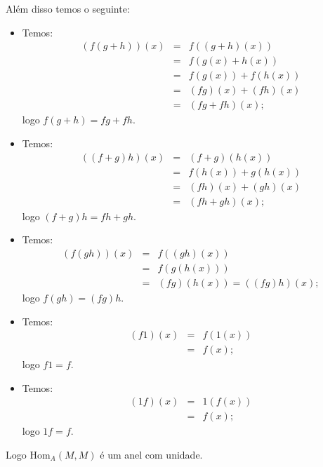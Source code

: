 \documentclass[10pt,a4paper]{article}
\begin{document}
\noindent
Além disso temos o seguinte:
\begin{itemize}
\item Temos:
\[
\begin{array}{rcl}
(f(g+h))(x)&=&f((g+h)(x))\\&=&f(g(x)+h(x))\\&=&f(g(x))+f(h(x))\\&=&(fg)(x)+(fh)(x)\\&=&(fg+fh)(x);
\end{array}
\]
logo $f(g+h)=fg+fh$.
\item Temos:
\[
\begin{array}{rcl}
((f+g)h)(x)&=&(f+g)(h(x))\\&=&f(h(x))+g(h(x))\\&=&(fh)(x)+(gh)(x)\\&=&(fh+gh)(x);
\end{array}
\]
logo $(f+g)h=fh+gh$.
\item Temos:
\[
\begin{array}{rcl}
(f(gh))(x)&=&f((gh)(x))\\&=&f(g(h(x)))\\&=&(fg)(h(x))=((fg)h)(x);
\end{array}
\]
logo $f(gh)=(fg)h$.
\item Temos:
\[
\begin{array}{rcl}
(f1)(x)&=&f(1(x))\\&=&f(x);
\end{array}
\]
logo $f1=f$.
\item Temos:
\[
\begin{array}{rcl}
(1f)(x)&=&1(f(x))\\&=&f(x);
\end{array}
\]
logo $1f=f$.
\end{itemize}

\noindent
Logo $\mathrm{Hom}_A(M,M)$ é um anel com unidade.
\end{document}

